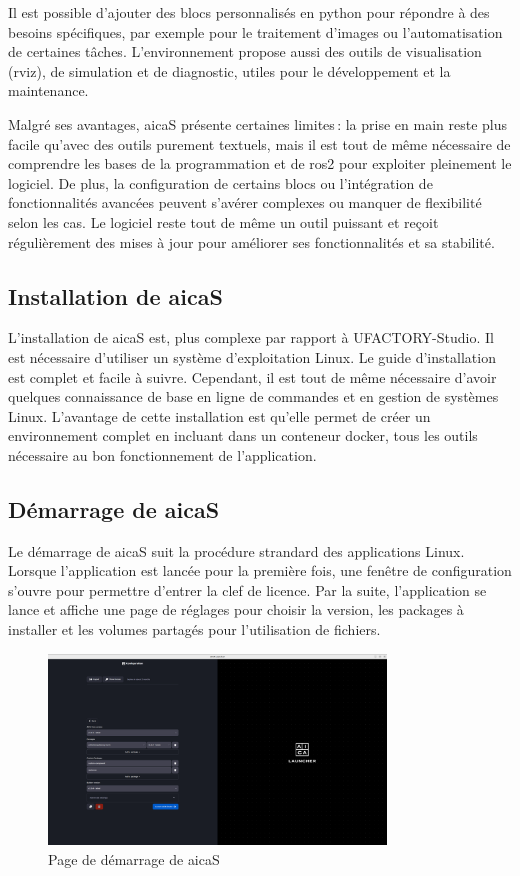 Il est possible d’ajouter des blocs personnalisés en \gls{python} pour répondre à des besoins spécifiques, par exemple pour le traitement d’images ou l’automatisation de certaines tâches. L’environnement propose aussi des outils de visualisation (\gls{rviz}), de simulation et de diagnostic, utiles pour le développement et la maintenance.

Malgré ses avantages, \gls{aicaS} présente certaines limites : la prise en main reste plus facile qu’avec des outils purement textuels, mais il est tout de même nécessaire de comprendre les bases de la programmation et de \gls{ros2} pour exploiter pleinement le logiciel. De plus, la configuration de certains blocs ou l’intégration de fonctionnalités avancées peuvent s’avérer complexes ou manquer de flexibilité selon les cas. Le logiciel reste tout de même un outil puissant et reçoit régulièrement des mises à jour pour améliorer ses fonctionnalités et sa stabilité.

\subsection{Installation de \gls{aicaS}}
L'installation de \gls{aicaS} est, plus complexe par rapport à UFACTORY-Studio. Il est nécessaire d'utiliser un système d'exploitation Linux. Le guide d'installation \cite{AICADocs} est complet et facile à suivre. Cependant, il est tout de même nécessaire d'avoir quelques connaissance de base en ligne de commandes et en gestion de systèmes Linux. L'avantage de cette installation est qu'elle permet de créer un environnement complet en incluant dans un \gls{conteneur} \gls{docker}, tous les outils nécessaire au bon fonctionnement de l'application.

\subsection{Démarrage de \gls{aicaS}}
Le démarrage de \gls{aicaS} suit la procédure strandard des applications Linux. Lorsque l'application est lancée pour la première fois, une fenêtre de configuration s'ouvre pour permettre d'entrer la clef de licence. Par la suite, l'application se lance et affiche une page de réglages pour choisir la version, les packages à installer et les volumes partagés pour l'utilisation de fichiers.

\begin{figure}[H]
    \centering
    \includegraphics[width=0.8\textwidth]{assets/figures/AICA_Mainmenu.png}
    \caption{Page de démarrage de \gls{aicaS}}
    \label{fig:aica_startup}
\end{figure}

